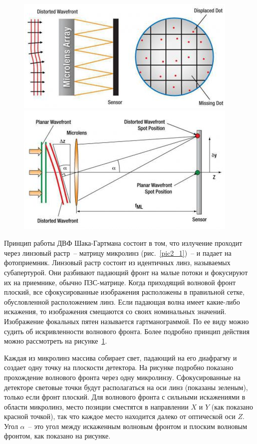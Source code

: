 \documentclass[pscyr]{hedwork}
\newcommand{\pic}[1]{\ref{pic#1}}
\begin{document}
\begin{figure}[ht]
  \center
  \includegraphics[width=.47\textwidth]{sl_2_1} \hfill
  \includegraphics[width=.47\textwidth]{sl_2_2} \\
  \parbox{.47\textwidth}{ \caption{} \label{pic2_1} } \hfill
  \parbox{.47\textwidth}{ \caption{} \label{pic2_2} }
\end{figure}

Принцип работы ДВФ Шака-Гартмана состоит в том, что излучение проходит через
линзовый растр~-- матрицу микролинз (рис.~\pic{2_1})~-- и падает на
фотоприемник. Линзовый растр состоит из идентичных линз, называемых
субапертурой. Они разбивают падающий фронт на малые потоки и фокусируют их на
приемнике, обычно ПЗС-матрице. Когда приходящий волновой фронт плоский, все
сфокусированные изображения расположены в правильной сетке, обусловленной
расположением линз. Если падающая волна имеет какие-либо искажения, то
изображения смещаются со своих номинальных значений. Изображение фокальных пятен
называется гартманограммой. По ее виду можно судить об искривленности волнового
фронта. Более подробно принцип действия можно рассмотреть на рисунке~\pic{2_2}.

Каждая из микролинз массива собирает свет, падающий на его диафрагму и создает
одну точку на плоскости детектора. На рисунке подробно показано прохождение
волнового фронта через одну микролинзу. Сфокусированные на детекторе световые
точки будут располагаться на оси линз (показаны зеленым), только если фронт
плоский. Для волнового фронта с сильными искажениями в области микролинз, место
позиции сместятся в направлении \( X \) и \( Y \) (как показано красной точкой),
так что каждое место находится далеко от оптической оси \( Z \). Угол
\( \alpha \)~-- это угол между искаженным волновым фронтом и плоским волновым
фронтом, как показано на рисунке.
\end{document}
